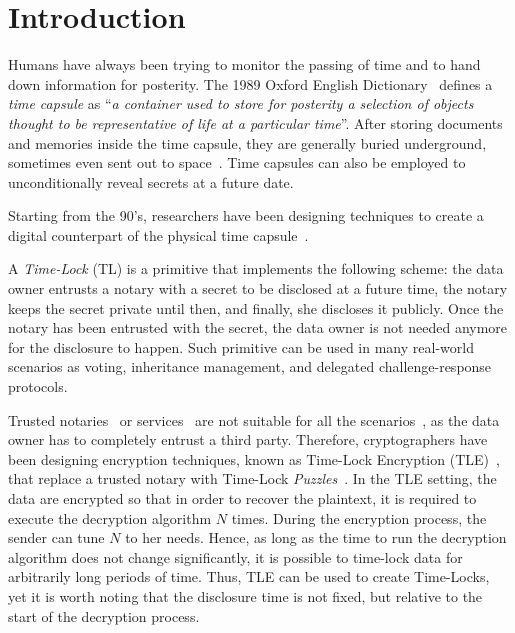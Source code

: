 \section{Introduction}\label{sect:introduction}

Humans have always been trying to monitor the passing of time and to hand down information for posterity.
The 1989 Oxford English Dictionary~\cite{dictionary1989oxford} defines a {\em time capsule} as ``{\em a container used to store for posterity a selection of objects thought to be representative of life at a particular time}''.
After storing documents and memories inside the time capsule, they are generally buried underground, sometimes even sent out to space~\cite{jarvis2015time}.
Time capsules can also be employed to unconditionally reveal secrets at a future date.

Starting from the 90's, researchers have been designing techniques to create a digital counterpart of the physical time capsule~\cite{may1993timed}.

A \textit{Time-Lock} (TL) is a primitive that implements the following scheme:
the data owner entrusts a notary with a secret to be disclosed at a future time, the notary keeps the secret private until then, and finally, she discloses it publicly. Once the notary has been entrusted with the secret, the data owner is not needed anymore for the disclosure to happen.
Such primitive can be used in many real-world scenarios as voting, inheritance management, and delegated challenge-response protocols.

Trusted notaries~\cite{10.1007/BFb0032349} or services~\cite{rabin2006time} are not suitable for all the scenarios~\cite{Abelson:1997:RKR:275079.275104}, as the data owner has to completely entrust a third party.
Therefore, cryptographers have been designing encryption techniques, known as Time-Lock Encryption (TLE)~\cite{may1993timed}, that replace a trusted notary with Time-Lock {\em Puzzles}~\cite{mahmoody-tl,Bitansky:2016:TPR:2840728.2840745}.
In the TLE setting, the data are encrypted so that in order to recover the plaintext, it is required to execute the decryption algorithm $N$ times.
During the encryption process, the sender can tune $N$ to her needs.
Hence, as long as the time to run the decryption algorithm does not change significantly, it is possible to time-lock data for arbitrarily long periods of time.
Thus, TLE can be used to create Time-Locks, yet it is worth noting that the disclosure time is not fixed, but relative to the start of the decryption process.

